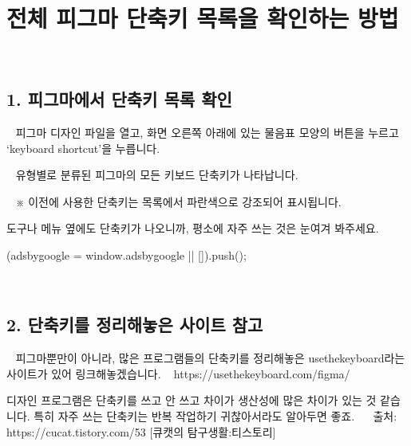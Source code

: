 \documentclass[12pt, a4paper, oneside]{book}
\begin{document}
	\section{전체 피그마 단축키 목록을 확인하는 방법}
 
	\subsection{1. 피그마에서 단축키 목록 확인}
 
피그마 디자인 파일을 열고, 화면 오른쪽 아래에 있는 물음표 모양의 버튼을 누르고 ‘keyboard shortcut’을 누릅니다.
 
 

 
유형별로 분류된 피그마의 모든 키보드 단축키가 나타납니다. 
 

 
※ 이전에 사용한 단축키는 목록에서 파란색으로 강조되어 표시됩니다.

도구나 메뉴 옆에도 단축키가 나오니까, 평소에 자주 쓰는 것은 눈여겨 봐주세요.
 


(adsbygoogle = window.adsbygoogle || []).push({});

 
	\subsection{2. 단축키를 정리해놓은 사이트 참고}
 
피그마뿐만이 아니라, 많은 프로그램들의 단축키를 정리해놓은 usethekeyboard라는 사이트가 있어 링크해놓겠습니다.
 
https://usethekeyboard.com/figma/

디자인 프로그램은 단축키를 쓰고 안 쓰고 차이가 생산성에 많은 차이가 있는 것 같습니다. 특히 자주 쓰는 단축키는 반복 작업하기 귀찮아서라도 알아두면 좋죠. 
 
출처: https://cucat.tistory.com/53 [큐캣의 탐구생활:티스토리]

\end{document}

